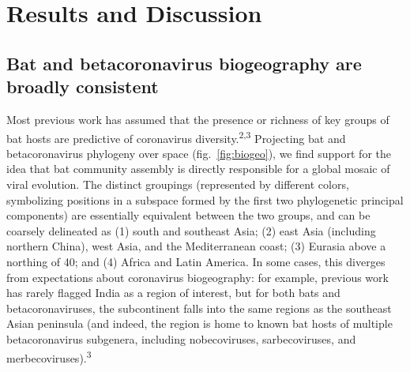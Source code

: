 \documentclass[11pt]{article}
\begin{document}
\hypertarget{results-and-discussion}{%
\section{Results and Discussion}\label{results-and-discussion}}

\hypertarget{bat-and-betacoronavirus-biogeography-are-broadly-consistent}{%
\subsection{Bat and betacoronavirus biogeography are broadly
consistent}\label{bat-and-betacoronavirus-biogeography-are-broadly-consistent}}

Most previous work has assumed that the presence or richness of key
groups of bat hosts are predictive of coronavirus
diversity.\textsuperscript{2,3} Projecting bat and betacoronavirus
phylogeny over space (fig.~\ref{fig:biogeo}), we find support for the
idea that bat community assembly is directly responsible for a global
mosaic of viral evolution. The distinct groupings (represented by
different colors, symbolizing positions in a subspace formed by the
first two phylogenetic principal components) are essentially equivalent
between the two groups, and can be coarsely delineated as (1) south and
southeast Asia; (2) east Asia (including northern China), west Asia, and
the Mediterranean coast; (3) Eurasia above a northing of 40; and (4)
Africa and Latin America. In some cases, this diverges from expectations
about coronavirus biogeography: for example, previous work has rarely
flagged India as a region of interest, but for both bats and
betacoronaviruses, the subcontinent falls into the same regions as the
southeast Asian peninsula (and indeed, the region is home to known bat
hosts of multiple betacoronavirus subgenera, including nobecoviruses,
sarbecoviruses, and merbecoviruses).\textsuperscript{3}
\end{document}
